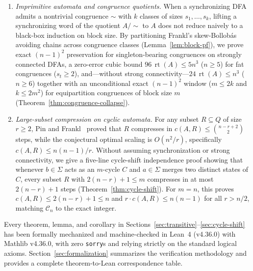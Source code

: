 \documentclass[11pt,a4paper]{article}
\theoremstyle{definition}
\theoremstyle{remark}
\newcommand{\rt}{\operatorname{rt}}
\begin{document}
\begin{enumerate}[leftmargin=*,nosep]
  \item \emph{Imprimitive automata and congruence quotients.} When a synchronizing DFA admits a nontrivial congruence $\sim$ with $k$ classes of sizes $s_1, \dots, s_k$, lifting a synchronizing word of the quotient $A/\sim$ to $A$ does not reduce naively to a black-box induction on block size. By partitioning Frankl's skew-Bollob\'as avoiding chains across congruence classes (Lemma~\ref{lem:block-pf}), we prove exact $(n-1)^2$ preservation for singleton-bearing congruences on strongly connected DFAs, a zero-error cubic bound $96\,\rt(A) \le 5n^3$ ($n \ge 5$) for fat congruences ($s_t \ge 2$), and---without strong connectivity---$24\,\rt(A) \le n^3$ ($n \ge 6$) together with an unconditional exact $(n - 1)^2$ window ($m \le 2k$ and $k \le 2m^2$) for equipartition congruences of block size $m$ (Theorem~\ref{thm:congruence-collapse}).

  \item \emph{Large-subset compression on cyclic automata.} For any subset $R \subseteq Q$ of size $r \ge 2$, Pin and Frankl~\cite{Frankl1982,Pin1983} proved that $R$ compresses in $c(A, R) \le \binom{n - r + 2}{2}$ steps, while the conjectural optimal scaling is $O(n^2/r)$, specifically $c(A, R) \le n(n - 1)/r$. Without assuming synchronization or strong connectivity, we give a five-line cycle-shift independence proof showing that whenever $b \in \Sigma$ acts as an $m$-cycle $C$ and $a \in \Sigma$ merges two distinct states of $C$, every subset $R$ with $2(n - r) + 1 \le m$ compresses in at most $2(n - r) + 1$ steps (Theorem~\ref{thm:cycle-shift}). For $m = n$, this proves $c(A, R) \le 2(n - r) + 1 \le n$ and $r \cdot c(A, R) \le n(n - 1)$ for all $r > n/2$, matching $\mathcal{C}_n$ to the exact integer.
\end{enumerate}

Every theorem, lemma, and corollary in Sections~\ref{sec:transitive}--\ref{sec:cycle-shift} has been formally mechanized and machine-checked in Lean~4 (v4.36.0) with Mathlib v4.36.0, with zero \texttt{sorry}s and relying strictly on the standard logical axioms. Section~\ref{sec:formalization} summarizes the verification methodology and provides a complete theorem-to-Lean correspondence table.
\end{document}
